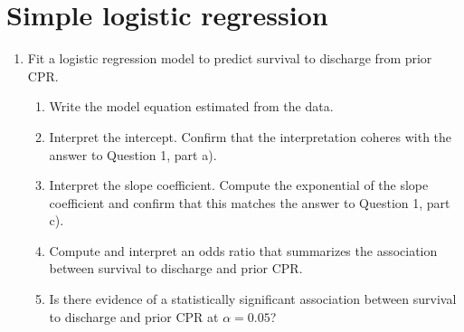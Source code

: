 \documentclass[letterpaper,12pt,twoside,]{pinp}
\begin{document}
\hypertarget{simple-logistic-regression}{%
\section{Simple logistic regression}\label{simple-logistic-regression}}

\begin{enumerate}
\def\labelenumi{\arabic{enumi}.}
\setcounter{enumi}{2}
\item
  Fit a logistic regression model to predict survival to discharge from
  prior CPR.

  \begin{enumerate}
  \def\labelenumii{\alph{enumii})}
  \item
    Write the model equation estimated from the data.
  \item
    Interpret the intercept. Confirm that the interpretation coheres
    with the answer to Question 1, part a).
  \item
    Interpret the slope coefficient. Compute the exponential of the
    slope coefficient and confirm that this matches the answer to
    Question 1, part c).
  \item
    Compute and interpret an odds ratio that summarizes the association
    between survival to discharge and prior CPR.
  \item
    Is there evidence of a statistically significant association between
    survival to discharge and prior CPR at \(\alpha = 0.05\)?
  \end{enumerate}
\end{enumerate}

\newpage
\end{document}
